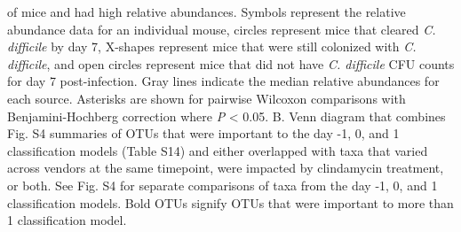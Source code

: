 \documentclass[11pt,]{article}
\begin{document}
of mice and had high relative abundances. Symbols represent the relative
abundance data for an individual mouse, circles represent mice that
cleared \emph{C. difficile} by day 7, X-shapes represent mice that were
still colonized with \emph{C. difficile}, and open circles represent
mice that did not have \emph{C. difficile} CFU counts for day 7
post-infection. Gray lines indicate the median relative abundances for
each source. Asterisks are shown for pairwise Wilcoxon comparisons with
Benjamini-Hochberg correction where \emph{P} \textless{} 0.05. B. Venn
diagram that combines Fig. S4 summaries of OTUs that were important to
the day -1, 0, and 1 classification models (Table S14) and either
overlapped with taxa that varied across vendors at the same timepoint,
were impacted by clindamycin treatment, or both. See Fig. S4 for
separate comparisons of taxa from the day -1, 0, and 1 classification
models. Bold OTUs signify OTUs that were important to more than 1
classification model.

\newpage
\end{document}
